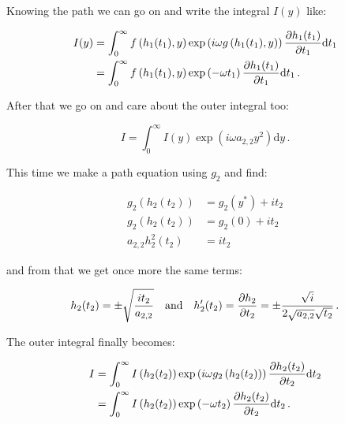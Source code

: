 \documentclass[a4paper,10pt]{article}
\begin{document}
Knowing the path we can go on and write the integral $I(y)$ like:

\begin{equation}
\begin{split}
 I(y) & = \int_0^\infty f\left(h_1(t_1), y\right)
                        \exp\left(i \omega g\left(h_1(t_1), y\right)\right)
                        \frac{\partial h_1(t_1)}{\partial t_1}
          \mathrm{d}t_1 \\
      & = \int_0^\infty f\left(h_1(t_1), y\right)
                        \exp\left(- \omega t_1\right)
                        \frac{\partial h_1(t_1)}{\partial t_1}
          \mathrm{d}t_1 \,.
\end{split}
\end{equation}

After that we go on and care about the outer integral too:

\begin{equation}
 I = \int_0^\infty I(y) \exp\left(i \omega a_{2,2} y^2\right) \mathrm{d}y \,.
\end{equation}

This time we make a path equation using $g_2$ and find:

\begin{equation}
\begin{split}
  g_2\left(h_2(t_2)\right) & = g_2(y^{*}) + i t_2 \\
  g_2\left(h_2(t_2)\right) & = g_2(0) + i t_2 \\
  a_{2,2} h_2^2(t_2)       & = i t_2
\end{split}
\end{equation}

and from that we get once more the same terms:

\begin{equation}
 h_2(t_2) = \pm \sqrt{\frac{i t_2}{a_{2,2}}}
 \quad \mathrm{and} \quad
 h_2^{\prime}(t_2) = \frac{\partial h_2}{\partial t_2} = \pm \frac{\sqrt{i}}{2\sqrt{a_{2,2}}\sqrt{t_2}} \,.
\end{equation}

The outer integral finally becomes:

\begin{equation}
\begin{split}
 I & = \int_0^\infty I\left(h_2(t_2)\right)
                     \exp\left(i \omega g_2\left(h_2(t_2)\right)\right)
                     \frac{\partial h_2(t_2)}{\partial t_2}
       \mathrm{d}t_2 \\
   & = \int_0^\infty I\left(h_2(t_2)\right)
                     \exp\left(- \omega t_2\right)
                     \frac{\partial h_2(t_2)}{\partial t_2}
       \mathrm{d}t_2 \,.
\end{split}
\end{equation}
\end{document}
